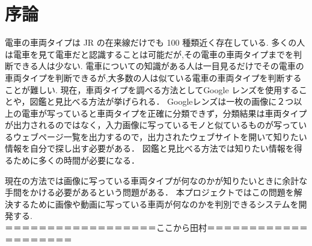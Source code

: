 

\chapter{序論}

電車の車両タイプは JR の在来線だけでも 100 種類近く存在している.
多くの人は電車を見て電車だと認識することは可能だが,その電車の車両タイプまでを判断できる人は少ない.
電車についての知識がある人は一目見るだけでその電車の車両タイプを判断できるが,大多数の人は似ている電車の車両タイプを判断することが難しい.
現在，車両タイプを調べる方法としてGoogle レンズを使用することや，図鑑と見比べる方法が挙げられる．
Googleレンズは一枚の画像に２つ以上の電車が写っていると車両タイプを正確に分類できず，分類結果は車両タイプが出力されるのではなく，入力画像に写っているモノと似ているものが写っているウェブページ一覧を出力するので，出力されたウェブサイトを開いて知りたい情報を自分で探し出す必要がある．
図鑑と見比べる方法では知りたい情報を得るために多くの時間が必要になる．

現在の方法では画像に写っている車両タイプが何なのかが知りたいときに余計な手間をかける必要があるという問題がある．
本プロジェクトではこの問題を解決するために画像や動画に写っている車両が何なのかを判別できるシステムを開発する.\\
＝＝＝＝＝＝＝＝＝＝＝＝＝＝＝＝＝＝ここから田村＝＝＝＝＝＝＝＝＝＝＝＝＝＝＝＝＝＝＝＝\\


